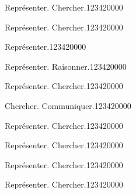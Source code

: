 \begin{pageAD}


\begin{ExoCad}{Représenter. Chercher.}{1234}{2}{0}{0}{0}{0}

\end{ExoCad}

\begin{ExoCad}{Représenter. Chercher.}{1234}{2}{0}{0}{0}{0}

\end{ExoCad}


\begin{ExoCad}{Représenter.}{1234}{2}{0}{0}{0}{0}
 
\end{ExoCad}


\begin{ExoCad}{Représenter. Raisonner.}{1234}{2}{0}{0}{0}{0}
 
\end{ExoCad}

 


\begin{ExoCad}{Représenter. Chercher.}{1234}{2}{0}{0}{0}{0}
 
\end{ExoCad}
 

\begin{ExoCad}{Chercher. Communiquer.}{1234}{2}{0}{0}{0}{0}
 
\end{ExoCad}


 
 
\begin{ExoCad}{Représenter. Chercher.}{1234}{2}{0}{0}{0}{0}
 
\end{ExoCad}

\begin{ExoCad}{Représenter. Chercher.}{1234}{2}{0}{0}{0}{0}
 
\end{ExoCad}

\begin{ExoCad}{Représenter. Chercher.}{1234}{2}{0}{0}{0}{0}
 
\end{ExoCad}

\begin{ExoCad}{Représenter. Chercher.}{1234}{2}{0}{0}{0}{0}
 
\end{ExoCad}


\end{pageAD}

